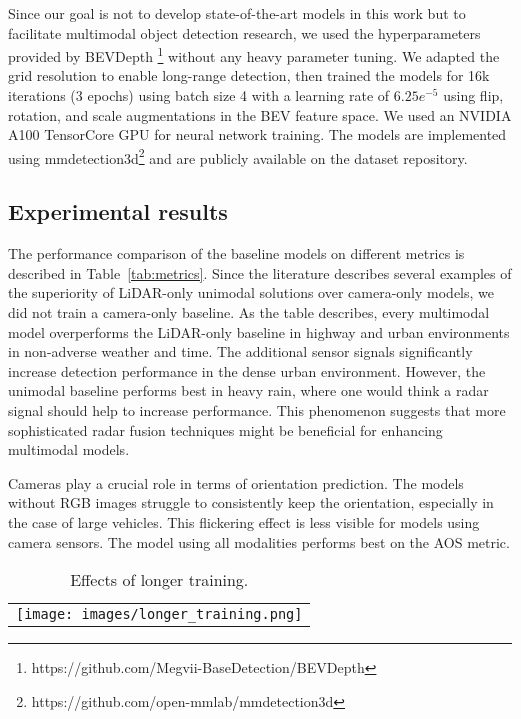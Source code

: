 \documentclass{article}
\begin{document}
Since our goal is not to develop state-of-the-art models in this work but to facilitate multimodal object detection research, we used the hyperparameters provided by BEVDepth \footnote{https://github.com/Megvii-BaseDetection/BEVDepth} without any heavy parameter tuning. We adapted the grid resolution to enable long-range detection, then trained the models for 16k iterations (3 epochs) using batch size 4 with a learning rate of $6.25e^{-5}$ using flip, rotation, and scale augmentations in the BEV feature space. We used an NVIDIA A100 TensorCore GPU for neural network training. The models are implemented using mmdetection3d\footnote{https://github.com/open-mmlab/mmdetection3d} and are publicly available on the dataset repository.

\subsection{Experimental results}
\label{subsec:exp_results}
The performance comparison of the baseline models on different metrics is described in Table~\ref{tab:metrics}. Since the literature describes several examples \citep{qian20223d, liu2022bevfusion} of the superiority of LiDAR-only unimodal solutions over camera-only models, we did not train a camera-only baseline. As the table describes, every multimodal model overperforms the LiDAR-only baseline in highway and urban environments in non-adverse weather and time. The additional sensor signals significantly increase detection performance in the dense urban environment. However, the unimodal baseline performs best in heavy rain, where one would think a radar signal should help to increase performance. This phenomenon suggests that more sophisticated radar fusion techniques might be beneficial for enhancing multimodal models.

Cameras play a crucial role in terms of orientation prediction. The models without RGB images struggle to consistently keep the orientation, especially in the case of large vehicles. This flickering effect is less visible for models using camera sensors. The model using all modalities performs best on the AOS metric.

\begin{table}[t]
  \centering  
  \begin{tabular}{c}       
    \texttt{[image: images/longer\_training.png]}
  \end{tabular}
  \caption{Effects of longer training.}
  \label{tab:metrics-long}
\end{table}
\end{document}
